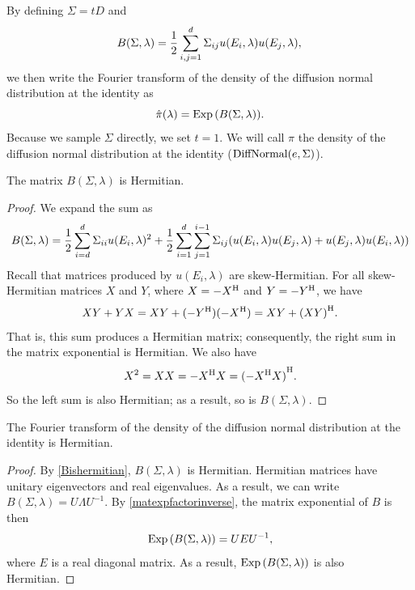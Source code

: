 \documentclass[../../main.tex]{subfiles}
\begin{document}
\begin{refsection}
	By defining $\Sigma = t D$ and
	\begin{equation}\label{Bmat}
		B(\Sigma, \lambda) = \frac{1}{2} \sum_{i,j=1}^d \Sigma_{ij} u(E_i, \lambda) u(E_j, \lambda),\\
	\end{equation}
	we then write the Fourier transform of the density of the diffusion normal distribution at the identity as
	\begin{equation} \label{identdiffnormalftrans}
		\hat{\pi}(\lambda) = \operatorname{Exp}\qty(B(\Sigma, \lambda)).
	\end{equation}
	Because we sample $\Sigma$ directly, we set $t = 1$.
	We will call $\pi$ the density of the diffusion normal distribution at the identity ($\operatorname{DiffNormal}(e, \Sigma)$).

	\begin{theorem} \label{Bishermitian}
		The matrix $B(\Sigma, \lambda)$ is Hermitian.
	\end{theorem}
	\begin{proof}
		We expand the sum as
		$$B(\Sigma, \lambda) = \frac{1}{2} \sum_{i=d}^d \Sigma_{ii} u(E_i, \lambda)^2 + \frac{1}{2} \sum_{i=1}^d \sum_{j=1}^{i-1} \Sigma_{ij} \qty(u(E_i, \lambda) u(E_j, \lambda) + u(E_j, \lambda) u(E_i, \lambda))$$
		Recall that matrices produced by $u(E_i, \lambda)$ are skew-Hermitian.
		For all skew-Hermitian matrices $X$ and $Y$, where $X = -{X}^\mathrm{H}$ and $Y = -{Y}^\mathrm{H}$, we have
		$$X Y + Y X = X Y + (-{Y}^\mathrm{H}) (-{X}^\mathrm{H}) = X Y + {(X Y)}^\mathrm{H}.$$
		That is, this sum produces a Hermitian matrix; consequently, the right sum in the matrix exponential is Hermitian.
		We also have
		$$X^2 = X X = -{X}^\mathrm{H} X = {(-{X}^\mathrm{H} X)}^\mathrm{H}.$$
		So the left sum is also Hermitian; as a result, so is $B(\Sigma, \lambda)$.
	\end{proof}

	\begin{theorem}\label{diff norm ftrans is hermitian}
		The Fourier transform of the density of the diffusion normal distribution at the identity is Hermitian.
	\end{theorem}
	\begin{proof}
		By \cref{Bishermitian}, $B(\Sigma, \lambda)$ is Hermitian.
		Hermitian matrices have unitary eigenvectors and real eigenvalues.
		As a result, we can write $B(\Sigma, \lambda) = U \Lambda U^{-1}$.
		By \cref{matexpfactorinverse}, the matrix exponential of $B$ is then
		$$\operatorname{Exp} \qty(B(\Sigma, \lambda)) = U E U^{-1},$$
		where $E$ is a real diagonal matrix.
		As a result, $\operatorname{Exp} \qty(B(\Sigma, \lambda))$ is also Hermitian.
	\end{proof}


\end{refsection}
\end{document}
